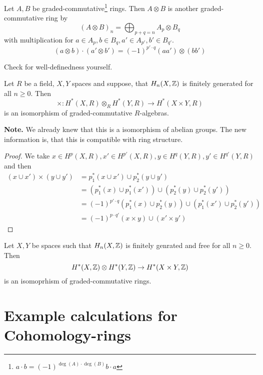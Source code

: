 \documentclass[language=english]{TemplateLecture}
\begin{document}
\begin{construction}
    Let \(A,B\) be graded-commutative\footnote{\(a \cdot b = (-1)^{\deg(A) \cdot\deg(B)} b\cdot a\)} rings. Then \(A\otimes B\) is another graded-commutative ring by
    \[(A\otimes B)_n = \bigoplus_{p+q = n} A_p \otimes B_q\]
    with multiplication for \(a \in A_p, b \in B_q, a' \in A_{p'}, b' \in B_{q'}\).
    \[(a\otimes b) \cdot (a' \otimes b') = (-1)^{p' \cdot q} (aa') \otimes (bb')\]

    Check for well-definedness yourself.
\end{construction}

\begin{corollary}
    Let \(R\) be a field, \(X,Y\) spaces and suppose, that \(H_n(X, \mathbb{Z})\) is finitely generated for all \(n \geq 0\). Then
    \[\times\colon H^*(X,R) \otimes_R H^*(Y,R) \to H^*(X\times Y, R)\]
    is an isomorphism of graded-commutative \(R\)-algebras.
\end{corollary}

\textbf{Note.} We already knew that this is a isomorphism of abelian groups. The new information is, that this is compatible with ring structure.

\begin{proof}
    We take \(x \in H^p(X,R), x' \in H^{p'}(X,R) , y \in H^q(Y,R) , y' \in H^{q'}(Y,R)\) and then
    \[\begin{split}
        (x \cup x') \times (y \cup y') &= p_1^*(x \cup x') \cup p_2^*(y \cup y')\\
        &= (p_1^*(x) \cup p_1^*(x')) \cup (p_2^*(y) \cup p_2^*(y')) \\
        &= (-1)^{p'\cdot q} (p_1^*(x) \cup p_2^*(y)) \cup (p_1^*(x') \cup p_2^*(y')) \\
        &=(-1)^{p\cdot q'} (x \times y) \cup (x' \times y')
    \end{split}\]
\end{proof}

\begin{corollary}
    Let \(X,Y\) be spaces such that \(H_n(X, \mathbb{Z})\) is finitely genrated and free for all \(n \geq 0\). Then
    \[H^*(X, \mathbb{Z}) \otimes H^*(Y,\mathbb{Z}) \to H^*(X\times Y, \mathbb{Z})\]
    is an isomoprhism of graded-commutative rings.
\end{corollary}

\section{Example calculations for Cohomology-rings}
\end{document}
